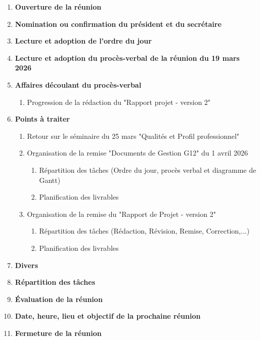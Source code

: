 \documentclass[12pt]{ULojpv}
\begin{document}
\entete
\begin{enumerate}
   \item \textbf{Ouverture de la réunion}
   \item \textbf{Nomination ou confirmation du président et du secrétaire}
   \item \textbf{Lecture et adoption de l'ordre du jour}
   \item \textbf{Lecture et adoption du procès-verbal de la réunion du 19 mars 2026}
   \item \textbf{Affaires découlant du procès-verbal}
      \begin{enumerate}
         \item Progression de la rédaction du "Rapport projet - version 2"
      \end{enumerate}
   \item \textbf{Points à traiter}
      \begin{enumerate}
         \item Retour sur le séminaire du 25 mars "Qualités et Profil professionnel"
         \item Organisation de la remise "Documents de Gestion G12" du 1 avril 2026
          \begin{enumerate}
               \item Répartition des tâches (Ordre du jour, procès verbal et diagramme de Gantt)
               \item Planification des livrables
            \end{enumerate}
        \item Organisation de la remise du "Rapport de Projet - version 2"  
        \begin{enumerate}
               \item Répartition des tâches (Rédaction, Révision, Remise, Correction,...)
               \item Planification des livrables
            \end{enumerate}
        
      \end{enumerate}
   \item \textbf{Divers}
   \item \textbf{Répartition des tâches}
   \item \textbf{Évaluation de la réunion}
   \item \textbf{Date, heure, lieu et objectif de la prochaine réunion}
   \item \textbf{Fermeture de la réunion}
\end{enumerate}
\end{document}
